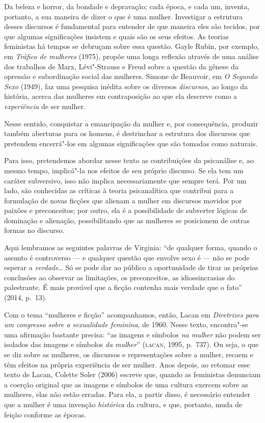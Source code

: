Da beleza e horror, da bondade e depravação; cada época, e cada um,
inventa, portanto, a sua maneira de dizer o que é uma mulher. Investigar
a estrutura desses discursos é fundamental para entender de que maneira
eles são tecidos, por que algumas significações insistem e quais são os
seus efeitos. As teorias feministas há tempos se debruçam sobre essa
questão. Gayle Rubin, por exemplo, em \emph{Tráfico de mulheres} (1975),
propõe uma longa reflexão através de uma análise dos trabalhos de Marx,
Lévi"-Strauss e Freud sobre a questão da gênese da opressão e
subordinação social das mulheres. Simone de Beauvoir, em \emph{O Segundo
Sexo} (1949), faz uma pesquisa inédita sobre os diversos
\emph{discursos}, ao longo da história, acerca das mulheres em
contraposição ao que ela descreve como a \emph{experiência} de ser
mulher.

Nesse sentido, conquistar a emancipação da mulher e, por consequência,
produzir também aberturas para os homens, é destrinchar a estrutura dos
discursos que pretendem encerrá"-los em algumas significações que são
tomadas como naturais.

Para isso, pretendemos abordar nesse texto as contribuições da
psicanálise e, ao mesmo tempo, implicá"-la nos efeitos de seu próprio
discurso. Se ela tem um caráter subversivo, isso não implica
necessariamente que sempre terá. Por um lado, são conhecidas as críticas
à teoria psicanalítica que contribui para a formulação de novas ficções
que alienam a mulher em discursos movidos por paixões e preconceitos;
por outro, ela é a possibilidade de subverter lógicas de dominação e
alienação, possibilitando que as mulheres se posicionem de outras formas
no discurso.

Aqui lembramos as seguintes palavras de Virginia: ``de qualquer forma,
quando o assunto é controverso --- e qualquer questão que envolve sexo é
--- não se pode esperar a \emph{verdade}\ldots{} Só se pode dar ao público a
oportunidade de tirar as próprias conclusões ao observar as limitações,
os preconceitos, as idiossincrasias do palestrante. É mais provável que
a ficção contenha mais verdade que o fato'' (2014, p.~13).

\asterisc

Com o tema ``mulheres e ficção'' acompanhamos, então, Lacan em
\emph{Diretrizes para um congresso sobre a sexualidade feminina}, de
1960. Nesse texto, encontra"-se uma afirmação bastante precisa: ``as
imagens e símbolos \emph{na mulher} não podem ser isolados das imagens e
símbolos \emph{da mulher}'' (\textsc{lacan}, 1995, p.~737). Ou seja, o que
se diz sobre as mulheres, os discursos e representações sobre a mulher,
recaem e têm efeitos na própria experiência de ser mulher. Anos depois,
ao retomar esse texto de Lacan, Colette Soler (2006) escreve que, quando
as feministas denunciam a coerção original que as imagens e símbolos de
uma cultura exercem sobre as mulheres, elas não estão erradas. Para ela,
a partir disso, é necessário entender que a mulher é uma invenção
\emph{histórica} da cultura, e que, portanto, muda de feição conforme as
épocas.

